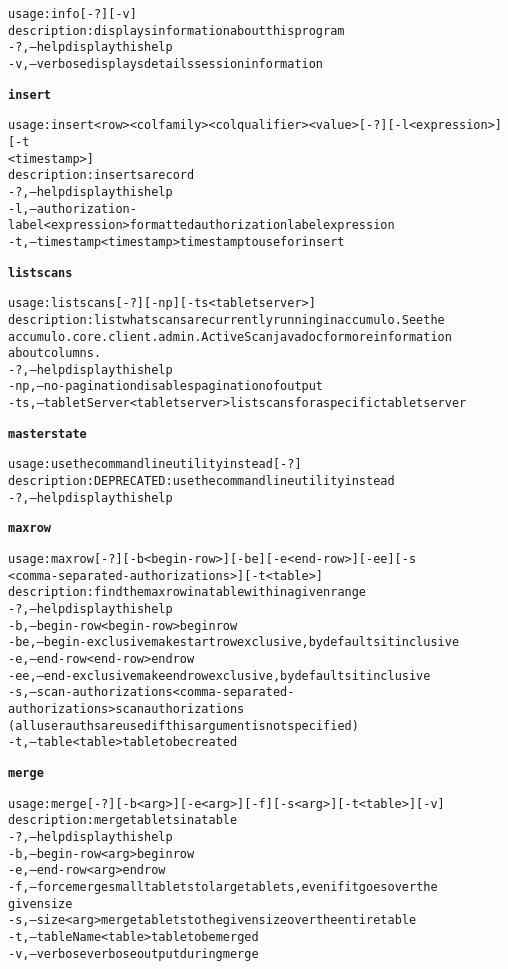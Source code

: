 \begin{alltt}
    usage: info [-?] [-v]
    description: displays information about this program
      -?,--help  display this help
      -v,--verbose	displays details session information

\textbf{insert}

    usage: insert <row> <colfamily> <colqualifier> <value> [-?] [-l <expression>] [-t
    	      <timestamp>]
    description: inserts a record
      -?,--help  display this help
      -l,--authorization-label <expression>  formatted authorization label expression
      -t,--timestamp <timestamp>  timestamp to use for insert

\textbf{listscans}

    usage: listscans [-?] [-np] [-ts <tablet server>]
    description: list what scans are currently running in accumulo. See the
    	      accumulo.core.client.admin.ActiveScan javadoc for more information
    	      about columns.
      -?,--help  display this help
      -np,--no-pagination  disables pagination of output
      -ts,--tabletServer <tablet server>  list scans for a specific tablet server

\textbf{masterstate}

    usage: use the command line utility instead [-?]
    description: DEPRECATED: use the command line utility instead
      -?,--help  display this help

\textbf{maxrow}

    usage: maxrow [-?] [-b <begin-row>] [-be] [-e <end-row>] [-ee] [-s
    	      <comma-separated-authorizations>] [-t <table>]
    description: find the max row in a table within a given range
      -?,--help  display this help
      -b,--begin-row <begin-row>  begin row
      -be,--begin-exclusive  make start row exclusive, by defaults it inclusive
      -e,--end-row <end-row>  end row
      -ee,--end-exclusive  make end row exclusive, by defaults it inclusive
      -s,--scan-authorizations <comma-separated-authorizations>  scan authorizations
    	      (all user auths are used if this argument is not specified)
      -t,--table <table>  table to be created

\textbf{merge}

    usage: merge [-?] [-b <arg>] [-e <arg>] [-f] [-s <arg>] [-t <table>] [-v]
    description: merge tablets in a table
      -?,--help  display this help
      -b,--begin-row <arg>	begin row
      -e,--end-row <arg>  end row
      -f,--force  merge small tablets to large tablets, even if it goes over the
    	      given size
      -s,--size <arg>  merge tablets to the given size over the entire table
      -t,--tableName <table>  table to be merged
      -v,--verbose	verbose output during merge


\end{alltt}
